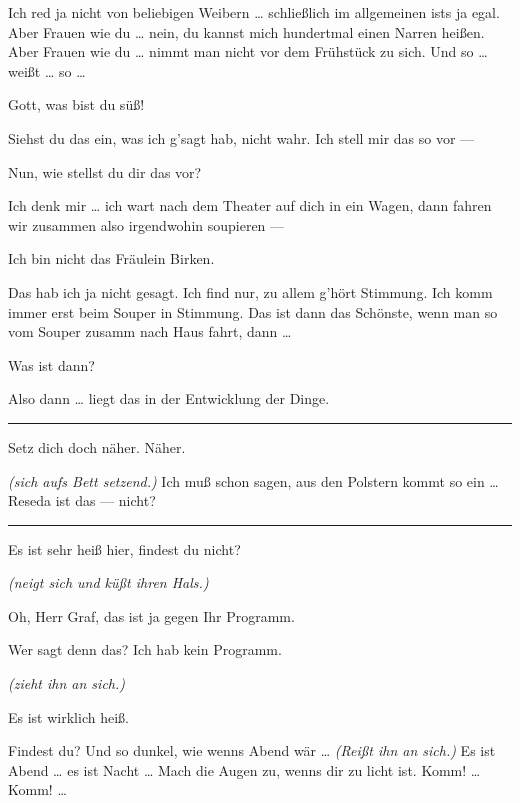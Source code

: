 \documentclass[
	final,
	a4paper,
	ngerman,
	mpinclude = true, %
	twoside = true,
	open = right,
	cleardoublepage = plain,
	DIV = 13,
	BCOR = 1cm,
	titlepage = firstiscover,
	]{scrbook}
\newcommand{\direction}[1]{\textit{(#1)}}
\newenvironment{deletion}{%
		\vspace{0.25\baselineskip}
		\hrule
		\vspace{0.25\baselineskip}
		\color{darkgray}
	}{
		\color{black}
		\vspace{0.25\baselineskip}
		\hrule 
		\vspace{0.25\baselineskip}
	}
\newcommand{\thecharacter}[1]{\textup{\textsc{#1}}\xspace}
\newcommand{\theschauspielerin}{\thecharacter{Daniela}}
\newcommand{\theentrepeneurin}{\thecharacter{Katerina Albrecht}}
\newcommand{\character}[1]{\item[#1:]}
\newcommand{\schauspielerin}{\character{\theschauspielerin}}
\newcommand{\entrepeneurin}{\character{\theentrepeneurin}}
\begin{document}
\begin{play}
	\entrepeneurin
	Ich red ja nicht von beliebigen Weibern \ldots{} schließlich im allgemeinen ists ja egal. Aber Frauen wie du \ldots{} nein, du kannst mich hundertmal einen Narren heißen. Aber Frauen wie du \ldots{} nimmt man nicht vor dem Frühstück zu sich. Und so \ldots{} weißt \ldots{} so \ldots{}

	\schauspielerin
	Gott, was bist du süß!

	\entrepeneurin
	Siehst du das ein, was ich g'sagt hab, nicht wahr. Ich stell mir das so vor ---

	\schauspielerin
	Nun, wie stellst du dir das vor?

	\entrepeneurin
	Ich denk mir \ldots{} ich wart nach dem Theater auf dich in ein Wagen, dann fahren wir zusammen also irgendwohin soupieren ---

	\schauspielerin
	Ich bin nicht das Fräulein Birken.

	\entrepeneurin
	Das hab ich ja nicht gesagt. Ich find nur, zu allem g'hört Stimmung. Ich komm immer erst beim Souper in Stimmung. Das ist dann das Schönste, wenn man so vom Souper zusamm nach Haus fahrt, dann \ldots{}

	\schauspielerin
	Was ist dann?

	\entrepeneurin
	Also dann \ldots{} liegt das in der Entwicklung der Dinge.

	\begin{deletion}
	\schauspielerin
	Setz dich doch näher. Näher.

	\entrepeneurin
	\direction{sich aufs Bett setzend.} Ich muß schon sagen, aus den Polstern kommt so ein \ldots{} Reseda ist das --- nicht?

	\end{deletion}
	\schauspielerin
	Es ist sehr heiß hier, findest du nicht?

	\entrepeneurin
	\direction{neigt sich und küßt ihren Hals.}

	\schauspielerin
	Oh, Herr Graf, das ist ja gegen Ihr Programm.

	\entrepeneurin
	Wer sagt denn das? Ich hab kein Programm.

	\schauspielerin
	\direction{zieht ihn an sich.}

	\entrepeneurin
	Es ist wirklich heiß.

	\schauspielerin
	Findest du? Und so dunkel, wie wenns Abend wär \ldots{} \direction{Reißt ihn an sich.} Es ist Abend \ldots{} es ist Nacht \ldots{} Mach die Augen zu, wenns dir zu licht ist. Komm! \ldots{} Komm! \ldots{}


\end{play}
\end{document}
